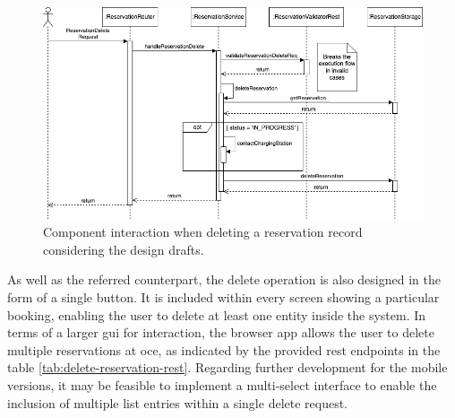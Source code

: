 \newpage

\begin{figure}[h]
    \centering
    \includegraphics[scale=0.4]{resources/images/main/6_implementation/processes/ReservationDelete.png}
    \caption{Component interaction when deleting a reservation record considering the design drafts.}
    \label{fig:delete-reservation-seqflow}
\end{figure}

\noindent As well as the referred counterpart, the delete operation is also designed in the form of a single button. It is included within every screen showing a particular booking, enabling the user to delete at least one entity inside the system.
In terms of a larger \acrshort{gui} for interaction, the browser app allows the user to delete multiple reservations at oce, as indicated by the provided \acrshort{rest} endpoints in the table \ref{tab:delete-reservation-rest}.
Regarding further development for the mobile versions, it may be feasible to implement a multi-select interface to enable the inclusion of multiple list entries within a single delete request.

